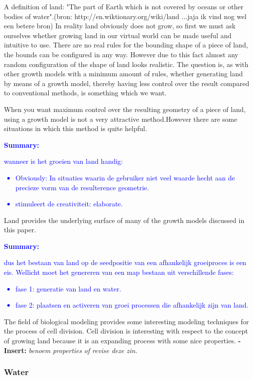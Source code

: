 \documentclass{article}
\newcommand{\inhoud}[1]{\textcolor{blue}{\textbf{\newline Summary: }\it{#1}}}
\newcommand{\voegtoe}[1]{\textcolor{MyDarkGreen}{\textbf{-Insert: }\it{#1}}}
\begin{document}
A definition of land: "The part of Earth which is not covered by oceans or other bodies of water".(bron: http://en.wiktionary.org/wiki/land ...jaja ik vind nog wel een betere bron)
In reality land obviously does not grow, so first we must ask ourselves whether growing land in our virtual world can be made useful and intuitive to use. There are no real rules for the bounding shape of a piece of land, the bounds can be configured in any way. However due to this fact almost any random configuration of the shape of land looks realistic. The question is, as with other growth models with a minimum amount of rules, whether generating land by means of a growth model, thereby having less control over the result compared to conventional methods, is something which we want. 

When you want maximum control over the resulting geometry of a piece of land, using a growth model is not a very attractive method.However there are some situations in which this method is quite helpful.

\inhoud
{wanneer is het groeien van land handig: 
\begin{itemize}
\item Obviously: In situaties waarin de gebruiker niet veel waarde hecht aan de precieze vorm van de resulterence geometrie.  
\item stimuleert de creativiteit: elaborate. 
\end{itemize}
}

Land provides the underlying surface of many of the growth models discussed in this paper. 

\inhoud
{dus het bestaan van land op de seedpositie van een afhankelijk groeiproces is een eis. Wellicht moet het genereren van een map bestaan uit verschillende fases:
\begin{itemize}
\item fase 1: generatie van land en water. 
\item fase 2: plaatsen en activeren van groei processen die afhankelijk zijn van land.  
\end{itemize}
}

The field of biological modeling provides some interesting modeling techniques for the process of cell division. 
Cell division is interesting with respect to the concept of growing land because it is an expanding process with some nice properties. \voegtoe{benoem properties of revise deze zin.} 


\subsubsection{Water} 
\end{document}
